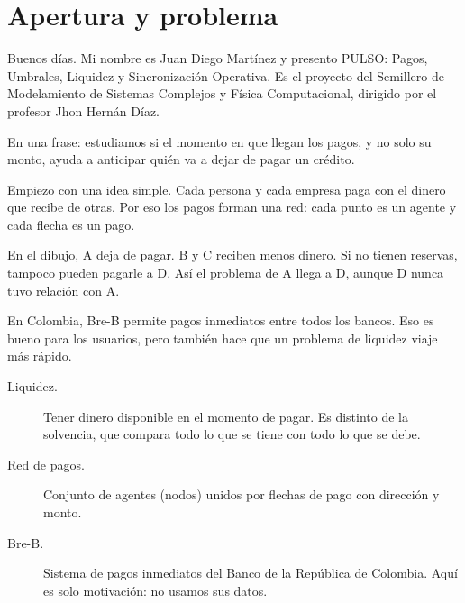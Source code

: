 \section{Apertura y problema}

\begin{decir}
Buenos días. Mi nombre es Juan Diego Martínez y presento PULSO: Pagos, Umbrales,
Liquidez y Sincronización Operativa. Es el proyecto del Semillero de Modelamiento de
Sistemas Complejos y Física Computacional, dirigido por el profesor Jhon Hernán Díaz.

En una frase: estudiamos si el momento en que llegan los pagos, y no solo su monto,
ayuda a anticipar quién va a dejar de pagar un crédito.
\end{decir}

\begin{decir}
Empiezo con una idea simple. Cada persona y cada empresa paga con el dinero que recibe
de otras. Por eso los pagos forman una red: cada punto es un agente y cada flecha es un
pago.

En el dibujo, A deja de pagar. B y C reciben menos dinero. Si no tienen reservas,
tampoco pueden pagarle a D. Así el problema de A llega a D, aunque D nunca tuvo relación
con A.

En Colombia, Bre-B permite pagos inmediatos entre todos los bancos. Eso es bueno para los
usuarios, pero también hace que un problema de liquidez viaje más rápido.
\end{decir}
\begin{terminos}
\begin{description}
\item[Liquidez.] Tener dinero disponible en el momento de pagar. Es distinto de la
solvencia, que compara todo lo que se tiene con todo lo que se debe.
\item[Red de pagos.] Conjunto de agentes (nodos) unidos por flechas de pago con
dirección y monto.
\item[Bre-B.] Sistema de pagos inmediatos del Banco de la República de Colombia. Aquí es
solo motivación: no usamos sus datos.
\end{description}
\end{terminos}

